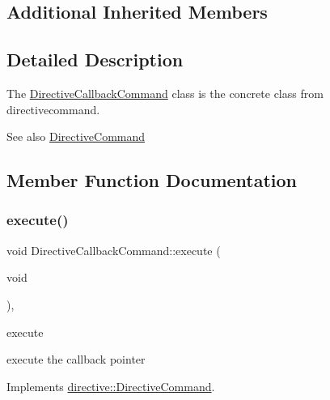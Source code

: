 \subsection*{Additional Inherited Members}


\subsection{Detailed Description}
The \hyperlink{classdirective_1_1DirectiveCallbackCommand}{Directive\+Callback\+Command} class is the concrete class from directivecommand. 

\begin{DoxySeeAlso}{See also}
\hyperlink{classdirective_1_1DirectiveCommand}{Directive\+Command} 
\end{DoxySeeAlso}


\subsection{Member Function Documentation}
\mbox{\label{classdirective_1_1DirectiveCallbackCommand_a1a2503c60e82f8165bce617abab9e78c}} 
\subsubsection{\texorpdfstring{execute()}{execute()}}
{\footnotesize\ttfamily void Directive\+Callback\+Command\+::execute (\begin{DoxyParamCaption}\item[{void}]{ }\end{DoxyParamCaption})\hspace{0.3cm}{\ttfamily [final]}, {\ttfamily [virtual]}}



execute 

execute the callback pointer 

Implements \hyperlink{classdirective_1_1DirectiveCommand}{directive\+::\+Directive\+Command}.

\mbox{\label{classdirective_1_1DirectiveCallbackCommand_a1a15a873c0213892ff78af2a91ed2f3d}} 
